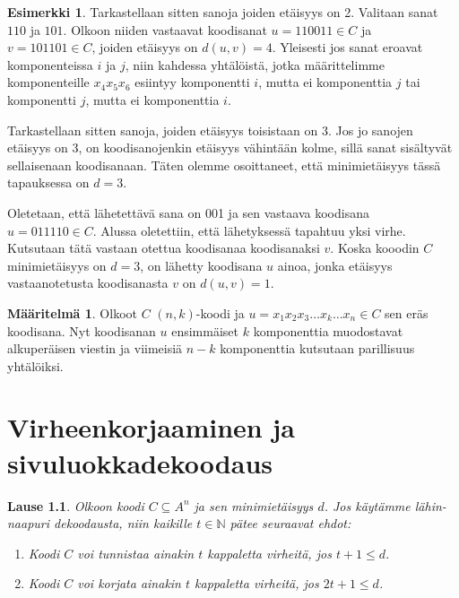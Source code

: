 \documentclass[a4paper,12pt,leqno,oneside]{report} %
\theoremstyle{plain}
\newtheorem{lause}{Lause}[chapter]
\theoremstyle{definition}
\newtheorem{maaritelma}{Määritelmä}[chapter]
\newtheorem{esimerkki}{Esimerkki}[chapter]
\theoremstyle{remark}
\numberwithin{equation}{chapter}
\newcommand*{\Nset}{\mathbb{N}}  %
\begin{document}
\begin{esimerkki}
        Tarkastellaan sitten sanoja joiden etäisyys on 2. Valitaan sanat $110$ ja $101$. Olkoon niiden vastaavat koodisanat $u = 110011 \in C$ ja $v = 101101 \in C$, joiden etäisyys on $d(u, v) = 4$. Yleisesti jos sanat eroavat komponenteissa $i$ ja $j$, niin kahdessa yhtälöistä, jotka määrittelimme komponenteille $x_4x_5x_6$ esiintyy komponentti $i$, mutta ei komponenttia $j$ tai komponentti $j$, mutta ei komponenttia $i$. 
        
        Tarkastellaan sitten sanoja, joiden etäisyys toisistaan on 3. Jos jo sanojen etäisyys on 3, on koodisanojenkin etäisyys vähintään kolme, sillä sanat sisältyvät sellaisenaan koodisanaan. Täten olemme osoittaneet, että minimietäisyys tässä tapauksessa on $d = 3$.

        Oletetaan, että lähetettävä sana on 001 ja sen vastaava koodisana $u = 011110 \in C$. 
        Alussa oletettiin, että lähetyksessä tapahtuu yksi virhe. Kutsutaan tätä vastaan otettua koodisanaa koodisanaksi $v$. Koska kooodin $C$ minimietäisyys on $d = 3$, on lähetty koodisana $u$ ainoa, jonka etäisyys vastaanotetusta koodisanasta $v$ on $d(u,v) = 1$.
    \end{esimerkki}

    \begin{maaritelma}\label{maar:nkkoodi}
        Olkoot $C$ $(n, k)$-koodi ja $u = x_1x_2x_3\dots x_k \dots x_n \in C$ sen eräs koodisana. Nyt koodisanan $u$ ensimmäiset $k$ komponenttia muodostavat alkuperäisen viestin ja viimeisiä $n-k$ komponenttia kutsutaan parillisuus yhtälöiksi.
    \end{maaritelma}

    \chapter{Virheenkorjaaminen ja sivuluokkadekoodaus}

    \begin{lause}\label{lause:nncorrection}
        Olkoon koodi $C \subseteq A^n$ ja sen minimietäisyys $d$. Jos käytämme lähin-naapuri dekoodausta, niin kaikille $t \in \Nset$ pätee seuraavat ehdot:
        \begin{enumerate}
            \item\label{kht:vtunnistus} Koodi $C$ voi tunnistaa ainakin $t$ kappaletta virheitä, jos $t + 1 \le d$.
            \item\label{kht:vkorjaus} Koodi $C$ voi korjata ainakin $t$ kappaletta virheitä, jos $2t + 1 \le d$.
        \end{enumerate}
    \end{lause}
\end{document}
